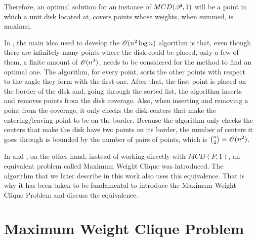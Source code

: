 Therefore, an optimal solution for an instance of $MCD(\mathscr{P},1)$ will be a point in which a unit disk located at, covers points whose weights, when summed, is maximal. 

In \cite{drezner}, the main idea used to develop the $\mathscr{O}(n^2\log{n})$ algorithm is that, even though there are infinitely many points where the disk could be placed, only a few of them, a finite amount of $\mathscr{O}(n^2)$, needs to be considered for the method to find an optimal one.
The algorithm, for every point, sorts the other points with respect to the angle they form with the first one. After that, the first point is placed on the border of the disk and, going through the sorted list, the algorithm inserts and removes points from the disk coverage. Also, when inserting and removing a point from the coverage, it only checks the disk centers that make the entering/leaving point to be on the border. Because the algorithm only checks the centers that make the disk have two points on its border, the number of centers it goes through is bounded by the number of pairs of points, which is $\binom{n}{2} = \mathscr{O}(n^2)$.

In \cite{chazelle:1986} and \cite{cabello:2006}, on the other hand, instead of working directly with $MCD(P,1)$, an equivalent problem called Maximum Weight Clique was introduced. The algorithm that we later describe in this work also uses this equivalence. That is why it has been taken to be fundamental to introduce the Maximum Weight Clique Problem and discuss the equivalence.




\section{Maximum Weight Clique Problem}

